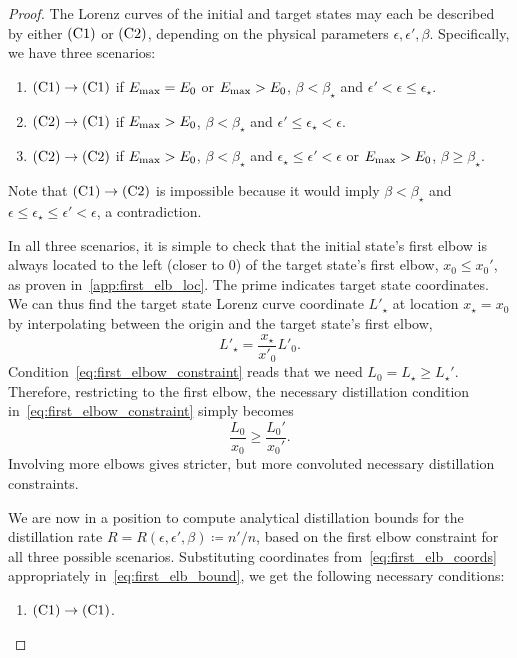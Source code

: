 \documentclass[pra,
aps,
twocolumn,
superscriptaddress,
groupedaddress,
nofootinbib,
reprint
]{revtex4-1}
\begin{document}
\begin{proof}
The Lorenz curves of the initial and target states may each be described by either $\rm{(C1)}$ or $\rm{(C2)}$, depending on the physical parameters $\epsilon, \epsilon', \beta$.
Specifically, we have three scenarios:
\begin{enumerate}
	\item $\rm{(C1)} \rightarrow \rm{(C1)}$ if $E_{\rm{max}} = E_0$ or $E_{\rm{max}} > E_0$, $\beta < \beta_{\star}$ and $\epsilon' < \epsilon  \leq \epsilon_{\star}$.
	\item $\rm{(C2)} \rightarrow \rm{(C1)}$ if $E_{\rm{max}} > E_0$, $\beta < \beta_{\star}$ and $\epsilon' \leq \epsilon_{\star} < \epsilon$.
	\item $\rm{(C2)} \rightarrow \rm{(C2)}$ if $E_{\rm{max}} > E_0$, $\beta < \beta_{\star}$ and $\epsilon_{\star} \leq \epsilon' < \epsilon$ or $E_{\rm{max}} > E_0$, $\beta \geq \beta_{\star}$.
\end{enumerate}
Note that $\rm{(C1)} \rightarrow \rm{(C2)}$ is impossible because it would imply $\beta < \beta_{\star}$ and $\epsilon \leq \epsilon_{\star} \leq \epsilon' < \epsilon$, a contradiction.

In all three scenarios, it is simple to check that the initial state's first elbow is always located to the left (closer to $0$) of the target state's first elbow, $x_0 \leq x_0'$, as proven in~\cref{app:first_elb_loc}.
The prime indicates target state coordinates.
We can thus find the target state Lorenz curve coordinate $L'_\star$ at location $x_\star = x_0$ by interpolating between the origin and the target state's first elbow, 
\begin{equation}\label{eq:constraint_deriv_temp}
	L'_\star = \frac{x_\star}{x'_0}L'_0.
\end{equation}
Condition~\cref{eq:first_elbow_constraint} reads that we need $L_0 = L_\star \geq L_\star'$. Therefore, restricting to the first elbow, the necessary distillation condition in~\cref{eq:first_elbow_constraint} simply becomes
\begin{equation}\label{eq:first_elb_bound}
	\frac{L_0}{x_0} \geq \frac{L_0'}{x_0'}.
\end{equation}
Involving more elbows gives stricter, but more convoluted necessary distillation constraints.

We are now in a position to compute analytical distillation bounds for the distillation rate $R = R(\epsilon, \epsilon', \beta) \coloneqq n'/n$, based on the first elbow constraint for all three possible scenarios.
Substituting coordinates from~\cref{eq:first_elb_coords} appropriately in~\cref{eq:first_elb_bound}, we get the following necessary conditions:
\begin{enumerate}
	\item $\rm{(C1)} \rightarrow \rm{(C1)}$.
	

\end{enumerate}
\end{proof}
\end{document}
